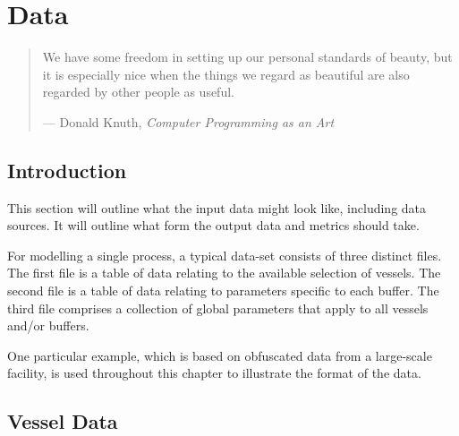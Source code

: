 %
%
%
%

\chapter{Data}\label{C.data}

\begin{quote}
We have some freedom in setting up our personal standards of beauty, but it is
especially nice when the things we regard as beautiful are also regarded by
other people as useful.

\hspace{2cm}--- Donald Knuth, \emph{Computer Programming as an Art}
\end{quote}

\section{Introduction}\label{S.intro3}

This section will outline what the input data might look like, including data
sources.
It will outline what form the output data and metrics should take.

For modelling a single process, a typical data-set consists of three distinct
files.
The first file is a table of data relating to the available selection of
vessels.
The second file is a table of data relating to parameters specific
to each buffer.
The third file comprises a collection of global parameters
that apply to all vessels and/or buffers.

One particular example, which is based on obfuscated data from a large-scale
facility, is used throughout this chapter to illustrate the format of the data.

\section{Vessel Data}\label{S.vesseldata}


